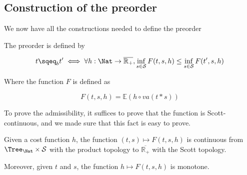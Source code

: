 
\subsection{Construction of the preorder}

We now have all the constructions needed to define the preorder

\begin{adefinition}[Preorder]
    The preorder is defined by

    \begin{equation*}
        t \sqeq_b t' \iff \forall h : \Nat \to \overline{\mathbb{R}_+}, 
        \inf_{ s \in \mathcal{S}} F (t,s,h) \leq \inf_{s \in \mathcal{S}} F (t',s,h)
    \end{equation*}

    Where the function $F$ is defined as 

    \begin{equation*}
        F(t,s,h) = \mathbb{E}(h \circ va(t * s))
    \end{equation*}
\end{adefinition}

To prove the admissibility, it suffices to prove that the function 
is Scott-continuous, and we made sure that this fact is easy to prove.

\begin{alemma}
    Given a cost function $h$, the function 
    $(t,s) \mapsto F(t,s,h)$ is continuous from $\Tree_\Nat \times
    \mathcal{S}$ with the product topology to $\overline{\mathbb{R}_+}$ with the 
    Scott topology.

    Moreover, given $t$ and $s$, the function $h \mapsto F(t,s,h)$ is monotone.
\end{alemma}

